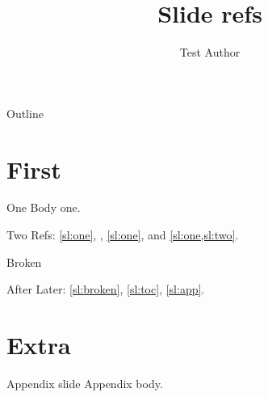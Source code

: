 \documentclass[aspectratio=169,10pt]{beamer}
\title{Slide refs}
\author{Test Author}
\begin{document}
\maketitle
\begin{frame}[toc]{Outline}
	\label{sl:toc}
	\tableofcontents
\end{frame}
\section{First}
\begin{frame}{One}\label{sl:one}
	Body one.
\end{frame}
\begin{frame}{Two}
	\label{sl:two}
	Refs: \cref{sl:one}, , \ref{sl:one}, and \cref{sl:one,sl:two}.
\end{frame}
\begin{frame}[allowframebreaks]{Broken}
	\label{sl:broken}
	\lipsum[1-4]
\end{frame}
\begin{frame}{After}
	Later: \cref{sl:broken}, \cref{sl:toc}, \cref{sl:app}.
\end{frame}
\appendix
\section{Extra}
\begin{frame}{Appendix slide}
	\label{sl:app}
	Appendix body.
\end{frame}
\end{document}
